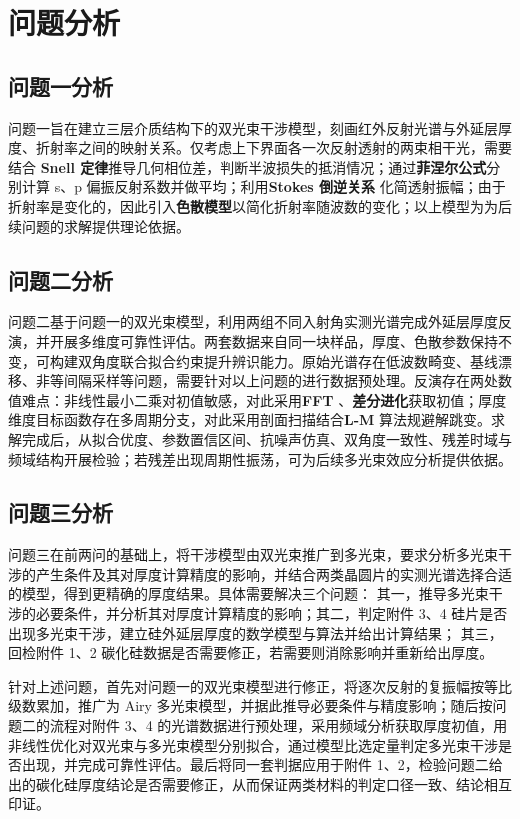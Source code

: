 \documentclass[withoutpreface,bwprint]{cumcmthesis}
\begin{document}
\section{问题分析}


\subsection {问题一分析}

问题一旨在建立三层介质结构下的双光束干涉模型，刻画红外反射光谱与外延层厚度、折射率之间的映射关系。仅考虑上下界面各一次反射透射的两束相干光，需要结合 \textbf{Snell 定律}推导几何相位差，判断半波损失的抵消情况；通过\textbf{菲涅尔公式}分别计算 s、p 偏振反射系数并做平均；利用\textbf{Stokes 倒逆关系} 化简透射振幅；由于折射率是变化的，因此引入\textbf{色散模型}以简化折射率随波数的变化；以上模型为为后续问题的求解提供理论依据。

\subsection {问题二分析}

问题二基于问题一的双光束模型，利用两组不同入射角实测光谱完成外延层厚度反演，并开展多维度可靠性评估。两套数据来自同一块样品，厚度、色散参数保持不变，可构建双角度联合拟合约束提升辨识能力。原始光谱存在低波数畸变、基线漂移、非等间隔采样等问题，需要针对以上问题的进行数据预处理。反演存在两处数值难点：非线性最小二乘对初值敏感，对此采用\textbf{FFT} 、\textbf{差分进化}获取初值；厚度维度目标函数存在多周期分支，对此采用剖面扫描结合\textbf{L-M} 算法规避解跳变。求解完成后，从拟合优度、参数置信区间、抗噪声仿真、双角度一致性、残差时域与频域结构开展检验；若残差出现周期性振荡，可为后续多光束效应分析提供依据。

\subsection{问题三分析}

问题三在前两问的基础上，将干涉模型由双光束推广到多光束，要求分析多光束干涉的产生条件及其对厚度计算精度的影响，并结合两类晶圆片的实测光谱选择合适的模型，得到更精确的厚度结果。具体需要解决三个问题：
其一，推导多光束干涉的必要条件，并分析其对厚度计算精度的影响；其二，判定附件 3、4 硅片是否出现多光束干涉，建立硅外延层厚度的数学模型与算法并给出计算结果；
其三，回检附件 1、2 碳化硅数据是否需要修正，若需要则消除影响并重新给出厚度。

针对上述问题，首先对问题一的双光束模型进行修正，将逐次反射的复振幅按等比级数累加，推广为 Airy 多光束模型，并据此推导必要条件与精度影响；随后按问题二的流程对附件 3、4 的光谱数据进行预处理，采用频域分析获取厚度初值，用非线性优化对双光束与多光束模型分别拟合，通过模型比选定量判定多光束干涉是否出现，并完成可靠性评估。最后将同一套判据应用于附件 1、2，检验问题二给出的碳化硅厚度结论是否需要修正，从而保证两类材料的判定口径一致、结论相互印证。
\end{document}

